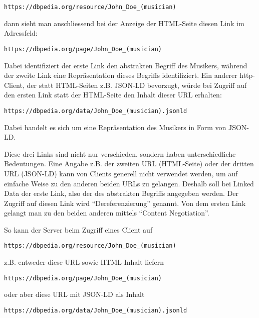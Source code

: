 \documentclass[,a4paper]{article}
\begin{document}
\begin{verbatim}
https://dbpedia.org/resource/John_Doe_(musician)
\end{verbatim}

dann sieht man anschliessend bei der Anzeige der HTML-Seite diesen Link
im Adressfeld:

\begin{verbatim}
https://dbpedia.org/page/John_Doe_(musician)
\end{verbatim}

Dabei identifiziert der erste Link den abstrakten Begriff des Musikers,
während der zweite Link eine Repräsentation dieses Begriffs
identifiziert. Ein anderer http-Client, der statt HTML-Seiten z.B.
JSON-LD bevorzugt, würde bei Zugriff auf den ersten Link statt der
HTML-Seite den Inhalt dieser URL erhalten:

\begin{verbatim}
https://dbpedia.org/data/John_Doe_(musician).jsonld
\end{verbatim}

Dabei handelt es sich um eine Repräsentation des Musikers in Form von
JSON-LD.

Diese drei Links sind nicht nur verschieden, sondern haben
unterschiedliche Bedeutungen. Eine Angabe z.B. der zweiten URL
(HTML-Seite) oder der dritten URL (JSON-LD) kann von Clients generell
nicht verwendet werden, um auf einfache Weise zu den anderen beiden URLs
zu gelangen. Deshalb soll bei Linked Data der erste Link, also der des
abstrakten Begriffs angegeben werden. Der Zugriff auf diesen Link wird
``Dereferenzierung'' genannt. Von dem ersten Link gelangt man zu den
beiden anderen mittels ``Content Negotiation''.

So kann der Server beim Zugriff eines Client auf

\begin{verbatim}
https://dbpedia.org/resource/John_Doe_(musician)
\end{verbatim}

z.B. entweder diese URL sowie HTML-Inhalt liefern

\begin{verbatim}
https://dbpedia.org/page/John_Doe_(musician)
\end{verbatim}

oder aber diese URL mit JSON-LD als Inhalt

\begin{verbatim}
https://dbpedia.org/data/John_Doe_(musician).jsonld
\end{verbatim}
\end{document}
